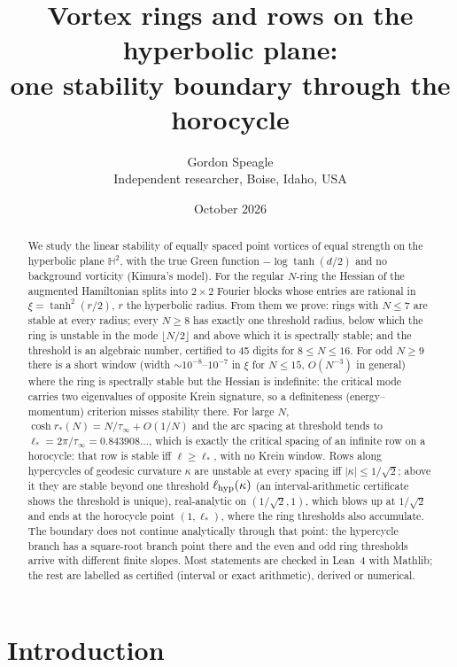 \documentclass[11pt]{article}
\title{Vortex rings and rows on the hyperbolic plane:\\ one stability boundary through the horocycle}
\author{Gordon Speagle\\\small Independent researcher, Boise, Idaho, USA}
\date{October 2026}
\theoremstyle{definition}
\theoremstyle{remark}
\newcommand{\HH}{\mathbb H^2}
\begin{document}
\maketitle

\begin{abstract}
We study the linear stability of equally spaced point vortices of equal strength on the hyperbolic plane $\HH$, with the
true Green function $-\log\tanh(d/2)$ and no background vorticity (Kimura's model). For the regular $N$-ring the Hessian of
the augmented Hamiltonian splits into $2\times2$ Fourier blocks whose entries are rational in $\xi=\tanh^2(r/2)$, $r$ the
hyperbolic radius. From them we prove: rings with $N\le7$ are stable at every radius; every $N\ge8$ has exactly one threshold
radius, below which the ring is unstable in the mode $\lfloor N/2\rfloor$ and above which it is spectrally stable; and the
threshold is an algebraic number, certified to 45 digits for $8\le N\le16$. For odd $N\ge9$ there is a short window
(width $\sim10^{-8}$--$10^{-7}$ in $\xi$ for $N\le15$, $O(N^{-3})$ in general) where the ring is spectrally stable but
the Hessian is indefinite: the critical mode carries two eigenvalues of opposite Krein signature, so a definiteness
(energy--momentum) criterion misses stability there. For large $N$, $\cosh r_*(N)=N/\tau_\infty+O(1/N)$ and the arc spacing
at threshold tends to $\ell_*=2\pi/\tau_\infty=0.843908\ldots$, which is exactly the critical spacing of an infinite row on a
horocycle: that row is stable iff $\ell\ge\ell_*$, with no Krein window. Rows along hypercycles of geodesic curvature
$\kappa$ are unstable at every spacing iff $|\kappa|\le1/\sqrt2$; above it they are stable beyond one threshold
$\ell_{\rm hyp}(\kappa)$ (an interval-arithmetic certificate shows the threshold is unique), real-analytic on $(1/\sqrt2,1)$,
which blows up at $1/\sqrt2$ and ends at the horocycle point $(1,\ell_*)$, where the ring thresholds also accumulate. The boundary does not continue analytically through that point:
the hypercycle branch has a square-root branch point there and the even and odd ring thresholds arrive with different
finite slopes. Most statements are checked in Lean~4 with Mathlib; the rest are labelled as certified (interval or exact
arithmetic), derived or numerical.
\end{abstract}

\tableofcontents

\section{Introduction}\label{sec:intro}
\end{document}
